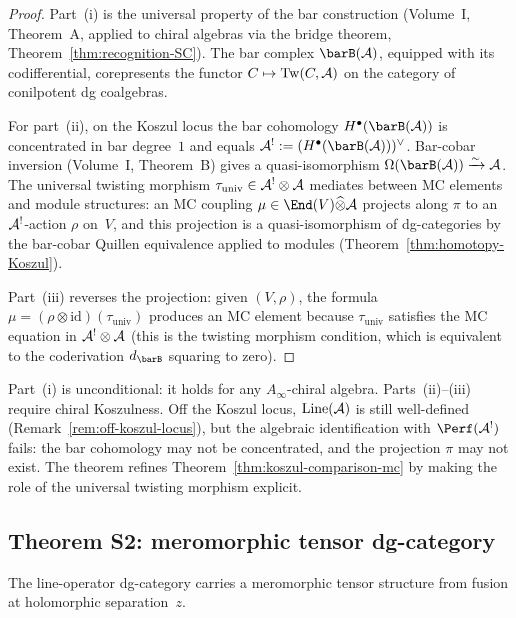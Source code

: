 \begin{proof}
Part~(i) is the universal property of the bar construction
(Volume~I, Theorem~A, applied to chiral algebras via the
bridge theorem, Theorem~\ref{thm:recognition-SC}). The bar
complex $\barB(\cA)$, equipped with its codifferential,
corepresents the functor $C \mapsto \operatorname{Tw}(C, \mathcal{A})$
on the category of conilpotent dg coalgebras.

For part~(ii), on the Koszul locus the bar cohomology
$H^\bullet(\barB(\cA))$ is concentrated in bar degree~$1$ and
equals $\cA^! := (H^\bullet(\barB(\cA)))^\vee$. Bar-cobar
inversion (Volume~I, Theorem~B) gives a quasi-isomorphism
$\Omega(\barB(\cA)) \xrightarrow{\sim} \cA$. The universal
twisting morphism $\tau_{\mathrm{univ}} \in \mathcal{A}^! \otimes \mathcal{A}$
mediates between MC elements and module structures:
an MC coupling $\mu \in \End(V) \widehat\otimes \cA$ projects
along $\pi$ to an $\mathcal{A}^!$-action $\rho$ on~$V$, and this
projection is a quasi-isomorphism of dg-categories by the
bar-cobar Quillen equivalence applied to modules
(Theorem~\ref{thm:homotopy-Koszul}).

Part~(iii) reverses the projection: given $(V, \rho)$,
the formula $\mu = (\rho \otimes \mathrm{id})(\tau_{\mathrm{univ}})$
produces an MC element because $\tau_{\mathrm{univ}}$ satisfies
the MC equation in $\mathcal{A}^! \otimes \mathcal{A}$ (this is the twisting
morphism condition, which is equivalent to the coderivation
$d_{\barB}$ squaring to zero).
\end{proof}

\begin{remark}
\label{rem:mc-couplings-scope}
Part~(i) is unconditional: it holds for any $A_\infty$-chiral
algebra. Parts~(ii)--(iii) require chiral Koszulness. Off the
Koszul locus, $\operatorname{Line}(\mathcal{A})$ is still well-defined
(Remark~\ref{rem:off-koszul-locus}), but the algebraic
identification with $\Perf(\cA^!)$ fails: the bar cohomology may
not be concentrated, and the projection $\pi$ may not exist.
The theorem refines
Theorem~\ref{thm:koszul-comparison-mc} by making the role of
the universal twisting morphism explicit.
\end{remark}

\subsection{Theorem S2: meromorphic tensor dg-category}
\label{subsec:meromorphic-tensor-cat}

The line-operator dg-category carries a meromorphic tensor
structure from fusion at holomorphic separation~$z$.

